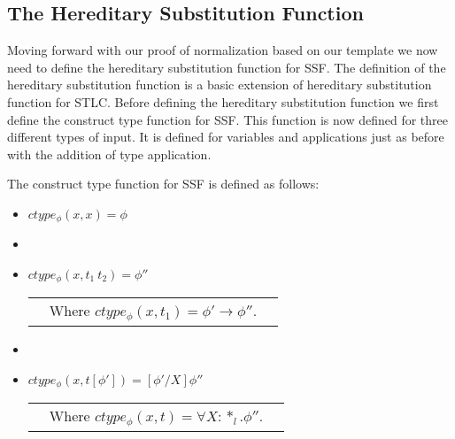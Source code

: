 \subsection{The Hereditary Substitution Function}
\label{subsec:the_hereditary_substitution_function}
Moving forward with our proof of normalization based on our template
we now need to define the hereditary substitution function for SSF.
The definition of the hereditary substitution function is a basic
extension of hereditary substitution function for STLC.  Before
defining the hereditary substitution function we first define the
construct type function for SSF.  This function is now defined for
three different types of input.  It is defined for variables and
applications just as before with the addition of type application.
\begin{definition}
  \label{def:ctype_function_ssf}
  The construct type function for SSF is defined as follows:
  \begin{itemize}
  \item[] $ctype_\phi(x,x) = \phi$
  \item[]
  \item[] $ctype_\phi(x,t_1\ t_2) = \phi''$\\
    \begin{tabular}{lll}
      & Where $ctype_\phi(x,t_1) = \phi' \to \phi''$.
    \end{tabular}    
  \item[]
  \item[] $ctype_\phi(x,t[\phi']) = [\phi'/X]\phi''$\\
    \begin{tabular}{lll}
      & Where $ctype_\phi(x,t) = \forall X:*_l.\phi''$.
    \end{tabular}    
  \end{itemize}
\end{definition}

